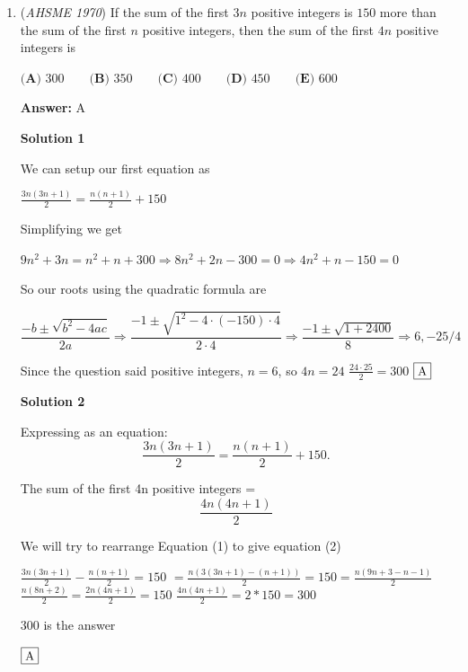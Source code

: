 \begin{enumerate}
 \textbf{Answer: }B



\textbf{Solution}

$\fbox{B}$



	\item (\textit{AHSME 1970}) If the sum of the first $3n$ positive integers is $150$ more than the sum of the first $n$ positive integers,
then the sum of the first $4n$ positive integers is


 $\textbf{(A) }300\qquad \textbf{(B) }350\qquad \textbf{(C) }400\qquad \textbf{(D) }450\qquad  \textbf{(E) }600$

 \textbf{Answer: }A



\textbf{Solution 1}

We can setup our first equation as

 $\frac{3n(3n+1)}{2} = \frac{n(n+1)}{2} + 150$

 Simplifying we get

 $9n^2 + 3n = n^2 + n + 300 \Rightarrow 8n^2 + 2n - 300 = 0 \Rightarrow 4n^2 + n - 150 = 0$

 So our roots using the quadratic formula are

 $\dfrac{-b\pm\sqrt{b^2 - 4ac}}{2a} \Rightarrow \dfrac{-1\pm\sqrt{1^2 - 4\cdot(-150)\cdot4}}{2\cdot4} \Rightarrow \dfrac{-1\pm\sqrt{1+2400}}{8} \Rightarrow 6, -25/4$

 Since the question said positive integers, $n = 6$, so $4n = 24$
$\frac{24\cdot 25}{2} = 300$
$\fbox{A}$




\textbf{Solution 2}

Expressing as an equation:\begin{equation}\tag{1}\frac{3n(3n+1)}{2} = \frac{n(n+1)}{2} + 150.  \end{equation}

 The sum of the first 4n positive integers =\begin{equation}\tag{2}\frac{4n(4n+1)}{2}\end{equation}

 We will try to rearrange Equation (1) to give equation (2)

 $\frac{3n(3n+1)}{2} - \frac{n(n+1)}{2} = 150$
$=\frac{n(3(3n+1)-(n+1))}{2} = 150 =\frac{n(9n+3-n-1)}{2}$
$\frac{n(8n+2)}{2}= \frac{2n(4n+1)}{2}  = 150$
$\frac{4n(4n+1)}{2} = 2*150 = 300$

 300 is the answer

 $\fbox{A}$


\end{enumerate}
